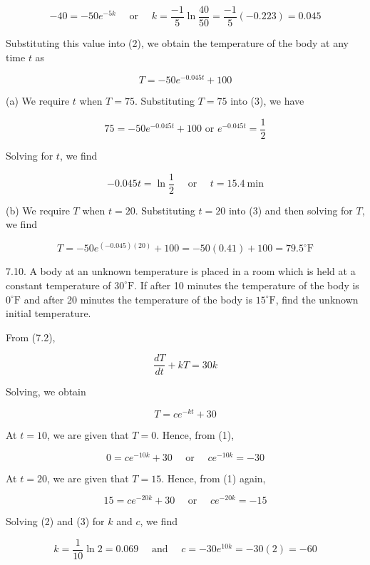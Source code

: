 \documentclass[10pt]{article}
\begin{document}
$$
-40=-50 e^{-5 k} \quad \text { or } \quad k=\frac{-1}{5} \ln \frac{40}{50}=\frac{-1}{5}(-0.223)=0.045
$$

Substituting this value into (2), we obtain the temperature of the body at any time $t$ as


\begin{equation*}
T=-50 e^{-0.045 t}+100 \tag{3}
\end{equation*}


(a) We require $t$ when $T=75$. Substituting $T=75$ into (3), we have

$$
75=-50 e^{-0.045 t}+100 \text { or } e^{-0.045 t}=\frac{1}{2}
$$

Solving for $t$, we find

$$
-0.045 t=\ln \frac{1}{2} \quad \text { or } \quad t=15.4 \mathrm{~min}
$$

(b) We require $T$ when $t=20$. Substituting $t=20$ into (3) and then solving for $T$, we find

$$
T=-50 e^{(-0.045)(20)}+100=-50(0.41)+100=79.5^{\circ} \mathrm{F}
$$

7.10. A body at an unknown temperature is placed in a room which is held at a constant temperature of $30^{\circ} \mathrm{F}$. If after 10 minutes the temperature of the body is $0^{\circ} \mathrm{F}$ and after 20 minutes the temperature of the body is $15^{\circ} \mathrm{F}$, find the unknown initial temperature.

From (7.2),

$$
\frac{d T}{d t}+k T=30 k
$$

Solving, we obtain


\begin{equation*}
T=c e^{-k t}+30 \tag{1}
\end{equation*}


At $t=10$, we are given that $T=0$. Hence, from (1),


\begin{equation*}
0=c e^{-10 k}+30 \quad \text { or } \quad c e^{-10 k}=-30 \tag{2}
\end{equation*}


At $t=20$, we are given that $T=15$. Hence, from (1) again,


\begin{equation*}
15=c e^{-20 k}+30 \quad \text { or } \quad c e^{-20 k}=-15 \tag{3}
\end{equation*}


Solving (2) and (3) for $k$ and $c$, we find

$$
k=\frac{1}{10} \ln 2=0.069 \quad \text { and } \quad c=-30 e^{10 k}=-30(2)=-60
$$
\end{document}
